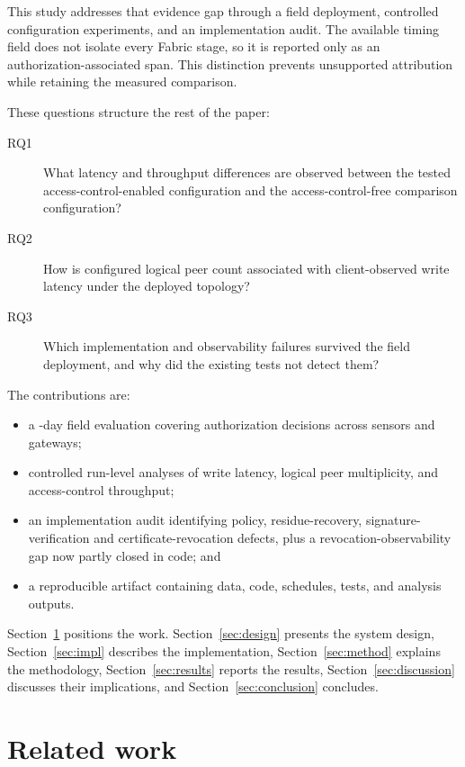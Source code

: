 \documentclass[a4paper,fleqn]{cas-dc}
\begin{document}
This study addresses that evidence gap through a field deployment, controlled
configuration experiments, and an implementation audit. The available timing
field does not isolate every Fabric stage, so it is reported only as an
authorization-associated span. This distinction prevents unsupported
attribution while retaining the measured comparison.

These questions structure the rest of the paper:

\begin{description}
\item[RQ1] What latency and throughput differences are observed between the
  tested access-control-enabled configuration and the access-control-free
  comparison configuration?
\item[RQ2] How is configured logical peer count associated with
  client-observed write latency under the deployed topology?
\item[RQ3] Which implementation and observability failures survived the
  field deployment, and why did the existing tests not detect them?
\end{description}

The contributions are:
\begin{itemize}
\item a \DeployDays{}-day field evaluation covering \TotalDecisions{}
authorization decisions across \DeploySensors{} sensors and
\DeployGateways{} gateways;
\item controlled run-level analyses of write latency, logical peer
multiplicity, and access-control throughput;
\item an implementation audit identifying policy, residue-recovery,
signature-verification and certificate-revocation defects, plus a
revocation-observability gap now partly closed in code; and
\item a reproducible artifact containing data, code, schedules, tests, and
analysis outputs.
\end{itemize}

Section~\ref{sec:related} positions the work. Section~\ref{sec:design}
presents the system design, Section~\ref{sec:impl} describes the
implementation, Section~\ref{sec:method} explains the methodology,
Section~\ref{sec:results} reports the results, Section~\ref{sec:discussion}
discusses their implications, and Section~\ref{sec:conclusion} concludes.

\section{Related work}
\label{sec:related}
\end{document}
